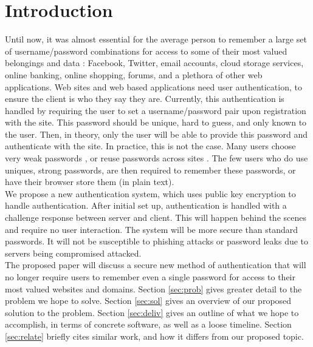 \documentclass[11pt]{article}
\begin{document}
\section{Introduction}
Until now, it was almost essential for the average person to remember a large set of username/password combinations for access to some of their most valued belongings and data : Facebook, Twitter, email accounts, cloud storage services, online banking, online shopping, forums, and a plethora of other web applications. Web sites and web based applications need user authentication, to ensure the client is who they say they are. Currently, this authentication is handled by requiring the user to set a username/password pair upon registration with the site. This password should be unique, hard to guess, and only known to the user. Then, in theory, only the user will be able to provide this password and authenticate with the site. In practice, this is not the case. Many users choose very weak passwords \cite{habits}, or reuse passwords across sites \cite{domino}. The few users who do use uniques, strong passwords, are then required to remember these passwords, or have their browser store them (in plain text).\\
We propose a new authentication system, which uses public key encryption to handle authentication. After initial set up, authentication is handled with a challenge response between server and client. This will happen behind the scenes and require no user interaction. The system will be more secure than standard passwords. It will not be susceptible to phishing attacks or password leaks due to servers being compromised attacked.\\
The proposed paper will discuss a secure new method of authentication that will no longer require users to remember even a single password for access to their most valued websites and domains. Section \ref{sec:prob} gives greater detail to the problem we hope to solve. Section \ref{sec:sol} gives an overview of our proposed solution to the problem. Section \ref{sec:deliv} gives an outline of what we hope to accomplish, in terms of concrete software, as well as a loose timeline. Section \ref{sec:relate} briefly cites similar work, and how it differs from our proposed topic.
\end{document}
